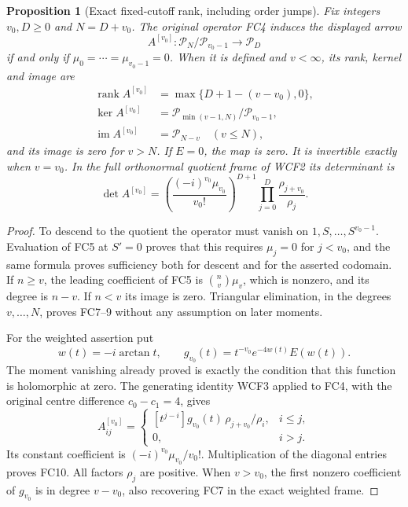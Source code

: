 \documentclass[11pt]{article}
\newtheorem{proposition}{Proposition}
\newcommand{\cP}{\mathcal P}
\newcommand{\rk}{\operatorname{rank}}
\begin{document}
\begin{proposition}[Exact fixed-cutoff rank, including order jumps]
Fix integers $v_0,D\ge0$ and $N=D+v_0$. The original operator FC4
induces the displayed arrow
\begin{equation}
 A^{[v_0]}:\cP_N/\cP_{v_0-1}\longrightarrow\cP_D\tag{FC6}
\end{equation}
if and only if $\mu_0=\cdots=\mu_{v_0-1}=0$.
When it is defined and $v<\infty$, its rank, kernel and image are
\begin{align}
 \rk A^{[v_0]}&=\max\{D+1-(v-v_0),0\},\tag{FC7}\\
 \ker A^{[v_0]}&=\cP_{\min(v-1,N)}/\cP_{v_0-1},\tag{FC8}\\
 \operatorname{im}A^{[v_0]}&=\cP_{N-v}\quad(v\le N),\tag{FC9}
\end{align}
and its image is zero for $v>N$. If $E=0$, the map is zero.
It is invertible exactly when $v=v_0$. In the full orthonormal
quotient frame of WCF2 its determinant is
\begin{equation}
 \det A^{[v_0]}=
 \left(\frac{(-i)^{v_0}\mu_{v_0}}{v_0!}\right)^{D+1}
 \prod_{j=0}^D\frac{\rho_{j+v_0}}{\rho_j}.\tag{FC10}
\end{equation}
\end{proposition}
\begin{proof}
To descend to the quotient the operator must vanish on
$1,S,\ldots,S^{v_0-1}$. Evaluation of FC5 at $S'=0$ proves that
this requires $\mu_j=0$ for $j<v_0$, and the same formula proves
sufficiency both for descent and for the asserted codomain.
If $n\ge v$, the leading coefficient of FC5 is
$\binom nv\mu_v$, which is nonzero, and its degree is $n-v$.
If $n<v$ its image is zero. Triangular elimination, in the degrees
$v,\ldots,N$, proves FC7--9 without any assumption on later moments.

For the weighted assertion put
\[
 w(t)=-i\arctan t,\qquad
 g_{v_0}(t)=t^{-v_0}e^{-4w(t)}E(w(t)).
\]
The moment vanishing already proved is exactly the condition that this
function is holomorphic at zero. The generating identity WCF3 applied
to FC4, with the original centre difference $c_0-c_1=4$, gives
\[
 A^{[v_0]}_{ij}=\begin{cases}
 [t^{j-i}]g_{v_0}(t)\,\rho_{j+v_0}/\rho_i,&i\le j,\\
 0,&i>j.
 \end{cases}
\]
Its constant coefficient is $(-i)^{v_0}\mu_{v_0}/v_0!$.
Multiplication of the diagonal entries proves FC10. All factors
$\rho_j$ are positive. When $v>v_0$, the first nonzero coefficient
of $g_{v_0}$ is in degree $v-v_0$, also recovering FC7 in the exact
weighted frame.
\end{proof}
\end{document}
